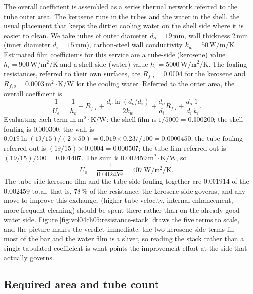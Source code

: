 The overall coefficient is assembled as a series thermal network
referred to the tube outer area. The kerosene runs in the tubes and the
water in the shell, the usual placement that keeps the dirtier
cooling water on the shell side where it is easier to clean. We take
tubes of outer diameter $d_o = 19\,\si{\milli\meter}$, wall thickness
$2\,\si{\milli\meter}$ (inner diameter $d_i = 15\,\si{\milli\meter}$),
carbon-steel wall conductivity $k_w = 50\,\si{\watt\per\meter\per
\kelvin}$. Estimated film coefficients for this service are a tube-side
(kerosene) value $h_i = 900\,\si{\watt\per\meter\squared\per\kelvin}$
and a shell-side (water) value $h_o = 5000\,\si{\watt\per\meter\squared
\per\kelvin}$. The fouling resistances, referred to their own surfaces,
are $R_{f,i} = 0.0004$ for the kerosene and $R_{f,o} = 0.0003\,\text{m}^2
\cdot\si{\kelvin}/\text{W}$ for the cooling water. Referred to the
outer area, the overall coefficient is
\[
\frac{1}{U_o} = \frac{1}{h_o} + R_{f,o} + \frac{d_o \ln(d_o/d_i)}{2 k_w}
+ \frac{d_o}{d_i}R_{f,i} + \frac{d_o}{d_i}\frac{1}{h_i}.
\]
Evaluating each term in $\text{m}^2\cdot\si{\kelvin}/\text{W}$: the
shell film is $1/5000 = 0.000200$; the shell fouling is $0.000300$; the
wall is $0.019\ln(19/15)/(2\times 50) = 0.019\times 0.237/100 =
0.0000450$; the tube fouling referred out is $(19/15)\times 0.0004 =
0.000507$; the tube film referred out is $(19/15)/900 = 0.001407$. The
sum is $0.002459\,\text{m}^2\cdot\si{\kelvin}/\text{W}$, so
\[
U_o = \frac{1}{0.002459} = 407\,\si{\watt\per\meter\squared\per\kelvin}.
\]
The tube-side kerosene film and the tube-side fouling together are
$0.001914$ of the $0.002459$ total, that is, $78\,\%$ of the resistance:
the kerosene side governs, and any move to improve this exchanger
(higher tube velocity, internal enhancement, more frequent cleaning)
should be spent there rather than on the already-good water side. Figure
\ref{fig:vol04ch06:resistance-stack} draws the five terms to scale, and the
picture makes the verdict immediate: the two kerosene-side terms fill most of the
bar and the water film is a sliver, so reading the stack rather than a single
tabulated coefficient is what points the improvement effort at the side that
actually governs.



\subsection{Required area and tube count}

